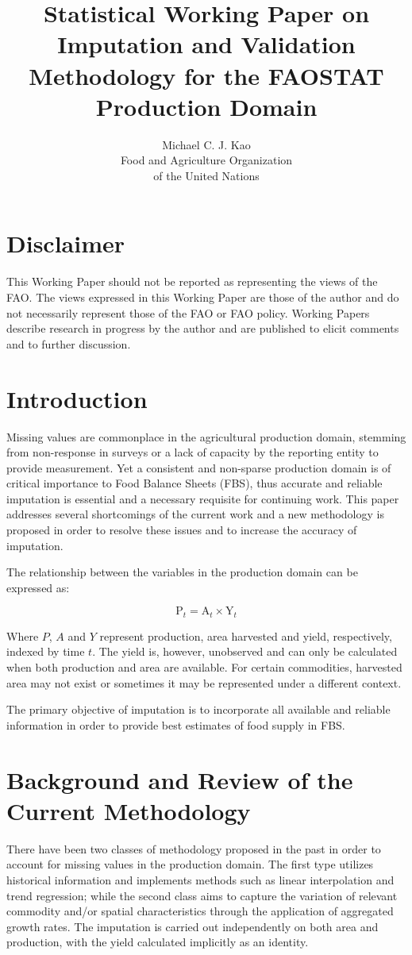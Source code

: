 \documentclass[nojss]{jss}\usepackage{graphicx, color}
\title{\bf Statistical Working Paper on Imputation and Validation
  Methodology for the FAOSTAT Production Domain}
\author{Michael C. J. Kao\\ Food and Agriculture Organization \\ of
  the United Nations}
\begin{document}
\section*{Disclaimer}
This Working Paper should not be reported as representing the views of
the FAO. The views expressed in this Working Paper are those of the
author and do not necessarily represent those of the FAO or FAO
policy. Working Papers describe research in progress by the author and
are published to elicit comments and to further discussion.

\section{Introduction}
Missing values are commonplace in the agricultural production domain,
stemming from non-response in surveys or a lack of capacity by the
reporting entity to provide measurement. Yet a consistent and
non-sparse production domain is of critical importance to Food Balance
Sheets (FBS), thus accurate and reliable imputation is essential and a
necessary requisite for continuing work. This paper addresses several
shortcomings of the current work and a new methodology is proposed in
order to resolve these issues and to increase the accuracy of
imputation.

The relationship between the variables in the production domain can be
expressed as:

\begin{equation}
  \label{eq:identity}
  \text{P}_t = \text{A}_t \times \text{Y}_t
\end{equation}


Where $P$, $A$ and $Y$ represent production, area harvested and yield,
respectively, indexed by time $t$. The yield is, however, unobserved and
can only be calculated when both production and area are
available. For certain commodities, harvested area may not exist or
sometimes it may be represented under a different context.


The primary objective of imputation is to incorporate all
available and reliable information in order to provide best estimates of
food supply in FBS.

\section{Background and Review of the Current Methodology}

There have been two classes of methodology proposed in the past in
order to account for missing values in the production domain. The
first type utilizes historical information and implements methods such
as linear interpolation and trend regression; while the second class
aims to capture the variation of relevant commodity
and/or spatial characteristics through the application of
aggregated growth rates. The imputation is carried out independently
on both area and production, with the yield calculated implicitly as
an identity.
\end{document}
